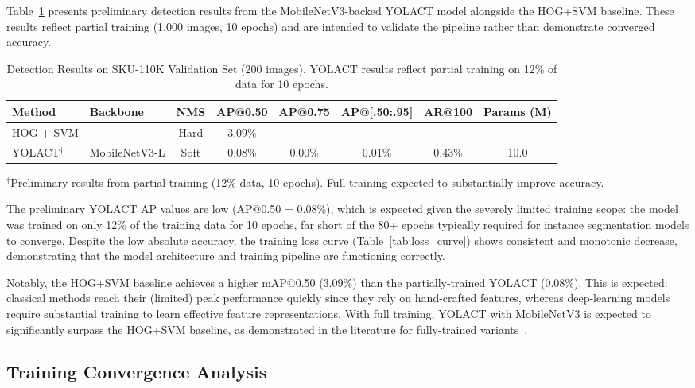 \documentclass[conference]{IEEEtran}
\begin{document}
Table~\ref{tab:main_results} presents preliminary detection results
from the MobileNetV3-backed YOLACT model alongside the HOG+SVM baseline.
These results reflect partial training (1{,}000 images, 10 epochs) and
are intended to validate the pipeline rather than demonstrate converged
accuracy.

\begin{table}[t]
  \centering
  \caption{Detection Results on SKU-110K Validation Set (200 images).
           YOLACT results reflect partial training on 12\% of data for
           10 epochs.}
  \label{tab:main_results}
  \begin{tabular}{@{}llcccccc@{}}
    \toprule
    Method & Backbone & NMS & AP@0.50 & AP@0.75 & AP@[.50:.95] & AR@100 & Params (M) \\
    \midrule
    HOG + SVM & --- & Hard & 3.09\% & --- & --- & --- & --- \\
    \midrule
    YOLACT$^\dagger$ & MobileNetV3-L & Soft & 0.08\% & 0.00\% & 0.01\% & 0.43\% & 10.0 \\
    \bottomrule
  \end{tabular}
  \vspace{2pt}

  {\small $^\dagger$Preliminary results from partial training (12\% data, 10 epochs). Full training expected to substantially improve accuracy.}
\end{table}

The preliminary YOLACT AP values are low (AP@0.50 = 0.08\%), which is
expected given the severely limited training scope: the model was trained
on only 12\% of the training data for 10 epochs, far short of the 80+
epochs typically required for instance segmentation models to converge.
Despite the low absolute accuracy, the training loss curve
(Table~\ref{tab:loss_curve}) shows consistent and monotonic decrease,
demonstrating that the model architecture and training pipeline are
functioning correctly.

Notably, the HOG+SVM baseline achieves a higher mAP@0.50 (3.09\%) than
the partially-trained YOLACT (0.08\%). This is expected: classical
methods reach their (limited) peak performance quickly since
they rely on hand-crafted features, whereas deep-learning models require
substantial training to learn effective feature representations. With
full training, YOLACT with MobileNetV3 is expected to significantly
surpass the HOG+SVM baseline, as demonstrated in the literature for
fully-trained variants~\cite{bolya2019yolact}.

\subsection{Training Convergence Analysis}
\label{sec:convergence}
\end{document}
